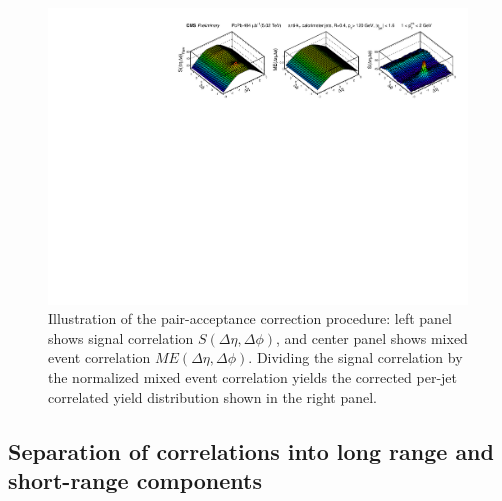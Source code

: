 \begin{figure}[ht!] 
\begin{center} 
\includegraphics[width=0.99\textwidth]{figures/Results/ME_Correction.pdf}
\caption[Illustration of the pair-acceptance correction procedure]{Illustration of the pair-acceptance correction procedure:  left panel shows signal correlation $S(\Delta\eta,\Delta\phi)$, and center panel shows mixed event correlation $ME(\Delta\eta,\Delta\phi)$.  Dividing the signal correlation by the normalized mixed event correlation yields the corrected per-jet correlated yield distribution shown in the right panel.}
\label{fig:ME_corr}
\end{center} 
\end{figure} 

  
\subsection{Separation of correlations into long range and short-range components}
\label{sec:bkg_sub}

